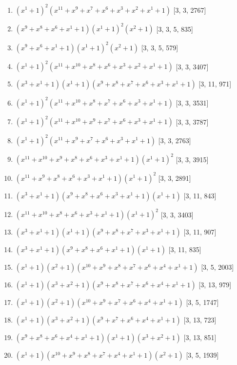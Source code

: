 \documentclass[10pt,twocolumn]{article}
\begin{document}
\begin{enumerate}
\item $(x^{1} + 1)^{2}(x^{11} + x^{9} + x^{7} + x^{6} + x^{3} + x^{2} + x^{1} + 1)$  [3, 3, 2767]
\item $(x^{9} + x^{8} + x^{6} + x^{1} + 1)(x^{1} + 1)^{2}(x^{2} + 1)$  [3, 3, 5, 835]
\item $(x^{9} + x^{6} + x^{1} + 1)(x^{1} + 1)^{2}(x^{2} + 1)$  [3, 3, 5, 579]
\item $(x^{1} + 1)^{2}(x^{11} + x^{10} + x^{8} + x^{6} + x^{3} + x^{2} + x^{1} + 1)$  [3, 3, 3407]
\item $(x^{3} + x^{1} + 1)(x^{1} + 1)(x^{9} + x^{8} + x^{7} + x^{6} + x^{3} + x^{1} + 1)$  [3, 11, 971]
\item $(x^{1} + 1)^{2}(x^{11} + x^{10} + x^{8} + x^{7} + x^{6} + x^{3} + x^{1} + 1)$  [3, 3, 3531]
\item $(x^{1} + 1)^{2}(x^{11} + x^{10} + x^{9} + x^{7} + x^{6} + x^{3} + x^{1} + 1)$  [3, 3, 3787]
\item $(x^{1} + 1)^{2}(x^{11} + x^{9} + x^{7} + x^{6} + x^{3} + x^{1} + 1)$  [3, 3, 2763]
\item $(x^{11} + x^{10} + x^{9} + x^{8} + x^{6} + x^{3} + x^{1} + 1)(x^{1} + 1)^{2}$  [3, 3, 3915]
\item $(x^{11} + x^{9} + x^{8} + x^{6} + x^{3} + x^{1} + 1)(x^{1} + 1)^{2}$  [3, 3, 2891]
\item $(x^{3} + x^{1} + 1)(x^{9} + x^{8} + x^{6} + x^{3} + x^{1} + 1)(x^{1} + 1)$  [3, 11, 843]
\item $(x^{11} + x^{10} + x^{8} + x^{6} + x^{3} + x^{1} + 1)(x^{1} + 1)^{2}$  [3, 3, 3403]
\item $(x^{3} + x^{1} + 1)(x^{1} + 1)(x^{9} + x^{8} + x^{7} + x^{3} + x^{1} + 1)$  [3, 11, 907]
\item $(x^{3} + x^{1} + 1)(x^{9} + x^{8} + x^{6} + x^{1} + 1)(x^{1} + 1)$  [3, 11, 835]
\item $(x^{1} + 1)(x^{2} + 1)(x^{10} + x^{9} + x^{8} + x^{7} + x^{6} + x^{4} + x^{1} + 1)$  [3, 5, 2003]
\item $(x^{1} + 1)(x^{3} + x^{2} + 1)(x^{9} + x^{8} + x^{7} + x^{6} + x^{4} + x^{1} + 1)$  [3, 13, 979]
\item $(x^{1} + 1)(x^{2} + 1)(x^{10} + x^{9} + x^{7} + x^{6} + x^{4} + x^{1} + 1)$  [3, 5, 1747]
\item $(x^{1} + 1)(x^{3} + x^{2} + 1)(x^{9} + x^{7} + x^{6} + x^{4} + x^{1} + 1)$  [3, 13, 723]
\item $(x^{9} + x^{8} + x^{6} + x^{4} + x^{1} + 1)(x^{1} + 1)(x^{3} + x^{2} + 1)$  [3, 13, 851]
\item $(x^{1} + 1)(x^{10} + x^{9} + x^{8} + x^{7} + x^{4} + x^{1} + 1)(x^{2} + 1)$  [3, 5, 1939]

\end{enumerate}
\end{document}
